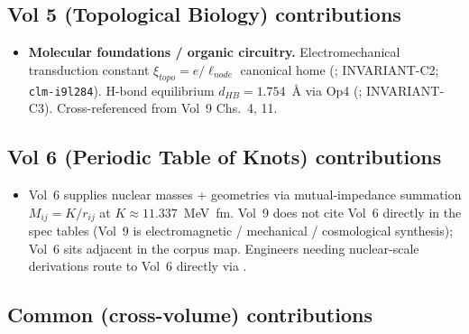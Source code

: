 \subsection{Vol 5 (Topological Biology) contributions}

\begin{itemize}
    \item \textbf{Molecular foundations / organic circuitry.} Electromechanical transduction constant $\xi_{topo} = e/\ell_{node}$ canonical home (; INVARIANT-C2; \texttt{clm-i9l284}). H-bond equilibrium $d_{HB} = 1.754$~\AA{} via Op4 (; INVARIANT-C3). Cross-referenced from Vol~9 Chs.~4, 11.
\end{itemize}

\subsection{Vol 6 (Periodic Table of Knots) contributions}

\begin{itemize}
    \item Vol~6 supplies nuclear masses + geometries via mutual-impedance summation $M_{ij} = K/r_{ij}$ at $K \approx 11.337$~MeV~fm. Vol~9 does not cite Vol~6 directly in the spec tables (Vol~9 is electromagnetic / mechanical / cosmological synthesis); Vol~6 sits adjacent in the corpus map. Engineers needing nuclear-scale derivations route to Vol~6 directly via .
\end{itemize}

\subsection{Common (cross-volume) contributions}

